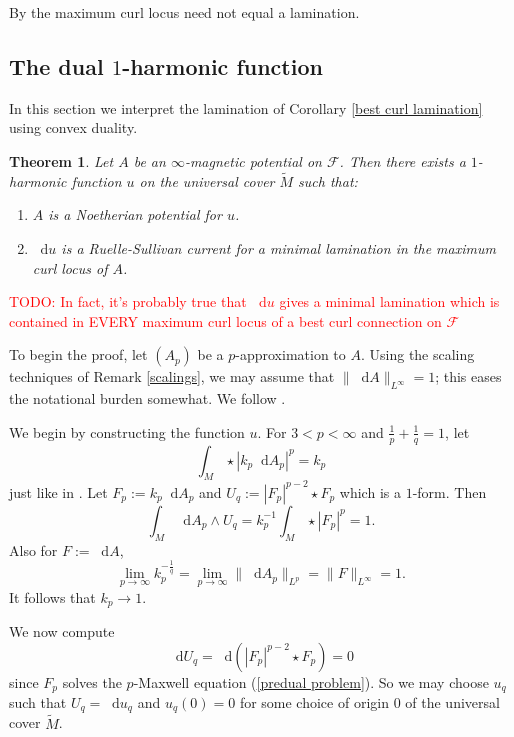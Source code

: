 \documentclass[reqno,11pt]{amsart}
\newcommand*\dif{\mathop{}\!\mathrm{d}}
\newtheorem{theorem}{Theorem}[section]
\theoremstyle{definition}
\numberwithin{equation}{section}
\newcommand\todo[1]{\textcolor{red}{TODO: #1}}
\begin{document}
By \cite[Example 5.4]{bangert_cui_2017} the maximum curl locus need not equal a lamination.

\subsection{The dual $1$-harmonic function}
In this section we interpret the lamination of Corollary \ref{best curl lamination} using convex duality.

\begin{theorem}
Let $A$ be an $\infty$-magnetic potential on $\mathscr F$.
Then there exists a $1$-harmonic function $u$ on the universal cover $\tilde M$ such that:
\begin{enumerate}
\item $A$ is a Noetherian potential for $u$.
\item $\dif u$ is a Ruelle-Sullivan current for a minimal lamination in the maximum curl locus of $A$.
\end{enumerate}
\end{theorem}

\todo{In fact, it's probably true that $\dif u$ gives a minimal lamination which is contained in EVERY maximum curl locus of a best curl connection on $\mathscr F$}

To begin the proof, let $(A_p)$ be a $p$-approximation to $A$.
Using the scaling techniques of Remark \ref{scalings}, we may assume that $\|\dif A\|_{L^\infty} = 1$; this eases the notational burden somewhat.
We follow \cite[\S6.1]{daskalopoulos2020transverse}.

We begin by constructing the function $u$.
For $3 < p < \infty$ and $\frac{1}{p} + \frac{1}{q} = 1$, let
$$\int_M \star |k_p \dif A_p|^p = k_p$$
just like in \cite[\S3.2]{daskalopoulos2020transverse}.
Let $F_p := k_p \dif A_p$ and $U_q := |F_p|^{p - 2} \star F_p$ which is a $1$-form.
Then 
\begin{equation}\label{dAp wedge Uq}
\int_M \dif A_p \wedge U_q = k_p^{-1} \int_M \star |F_p|^p = 1.
\end{equation}
Also for $F := \dif A$,
$$\lim_{p \to \infty} k_p^{-\frac{1}{q}} = \lim_{p \to \infty} \|\dif A_p\|_{L^p} = \|F\|_{L^\infty} = 1.$$
It follows that $k_p \to 1$.

We now compute
\begin{equation}\label{Uq is closed}
	\dif U_q = \dif(|F_p|^{p - 2} \star F_p) = 0
\end{equation}
since $F_p$ solves the $p$-Maxwell equation (\ref{predual problem}).
So we may choose $u_q$ such that $U_q = \dif u_q$ and $u_q(0) = 0$ for some choice of origin $0$ of the universal cover $\tilde M$.
\end{document}

